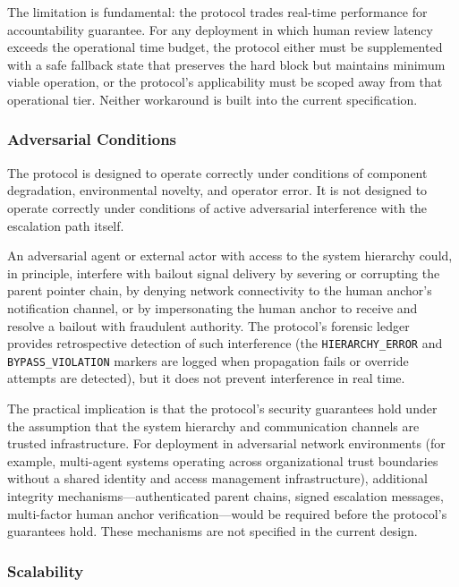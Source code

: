 The limitation is fundamental: the protocol trades real-time performance for accountability guarantee. For any deployment in which human review latency exceeds the operational time budget, the protocol either must be supplemented with a safe fallback state that preserves the hard block but maintains minimum viable operation, or the protocol's applicability must be scoped away from that operational tier. Neither workaround is built into the current specification.

\subsubsection{Adversarial Conditions}\label{sec:adversarial-conditions}

The protocol is designed to operate correctly under conditions of component degradation, environmental novelty, and operator error. It is not designed to operate correctly under conditions of active adversarial interference with the escalation path itself.

An adversarial agent or external actor with access to the system hierarchy could, in principle, interfere with bailout signal delivery by severing or corrupting the parent pointer chain, by denying network connectivity to the human anchor's notification channel, or by impersonating the human anchor to receive and resolve a bailout with fraudulent authority. The protocol's forensic ledger provides retrospective detection of such interference (the \texttt{HIERARCHY\_ERROR} and \texttt{BYPASS\_VIOLATION} markers are logged when propagation fails or override attempts are detected), but it does not prevent interference in real time.

The practical implication is that the protocol's security guarantees hold under the assumption that the system hierarchy and communication channels are trusted infrastructure. For deployment in adversarial network environments (for example, multi-agent systems operating across organizational trust boundaries without a shared identity and access management infrastructure), additional integrity mechanisms---authenticated parent chains, signed escalation messages, multi-factor human anchor verification---would be required before the protocol's guarantees hold. These mechanisms are not specified in the current design.

\subsubsection{Scalability}\label{sec:scalability}

